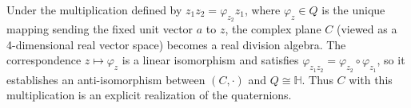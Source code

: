 Under the multiplication defined by $z_1 z_2 = \varphi_{z_2} z_1$, where $\varphi_z \in Q$ is the unique mapping sending the fixed unit vector $a$ to $z$, the complex plane $C$ (viewed as a 4-dimensional real vector space) becomes a real division algebra. The correspondence $z \mapsto \varphi_z$ is a linear isomorphism and satisfies $\varphi_{z_1 z_2} = \varphi_{z_2} \circ \varphi_{z_1}$, so it establishes an anti-isomorphism between $(C, \cdot)$ and $Q \cong \mathbb{H}$. Thus $C$ with this multiplication is an explicit realization of the quaternions.
